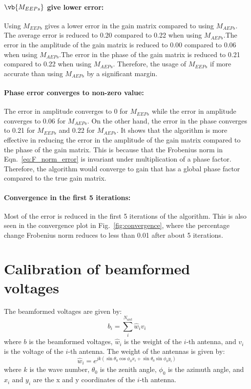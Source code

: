 \documentclass[10pt,a4paper,twocolumn]{paper}
\begin{document}
\paragraph*{$\vb{{M}_{EEPs}}$ give lower error:}Using $M_{EEPs}$ gives a lower error in the gain matrix compared to using $M_{AEPs}$. The average error is reduced to 0.20 compared to 0.22 when using $M_{AEPs}$.The error in the amplitude of the gain matrix is reduced to 0.00 compared to 0.06 when using $M_{AEPs}$.The error in the phase of the gain matrix is reduced to 0.21 compared to 0.22 when using $M_{AEPs}.$
Therefore, the usage of $M_{EEPs}$ if more accurate than using $M_{AEPs}$ by a significant margin.

\paragraph*{Phase error converges to non-zero value:}
The error in amplitude converges to 0 for $M_{EEPs}$ while the error in amplitude converges to 0.06 for $M_{AEPs}$. On the other hand, the error in the phase converges to 0.21 for $M_{EEPs}$ and 0.22 for $M_{AEPs}$.
It shows that the algorithm is more effective in reducing the error in the amplitude of the gain matrix compared to the phase of the gain matrix. This is because that the Frobenius norm in Eqn.~\ref{eq:F_norm_error} is invariant under multiplication of a phase factor. Therefore, the algorithm would converge to gain that has a global phase factor compared to the true gain matrix.

\paragraph*{Convergence in the first 5 iterations:}
Most of the error is reduced in the first 5 iterations of the algorithm. This is also seen in the convergence plot in Fig.~\ref{fig:convergence}, where the percentage change Frobenius norm reduces to less than 0.01 after about 5 iterations.

\section{Calibration of beamformed voltages}
The beamformed voltages are given by:
\begin{equation}
    b_i = \sum_{i}^{N_{ant}} \hat{w}_i v_i
    \label{eq:beamformed_voltages}
\end{equation}
where $b$ is the beamformed voltages, $\hat{w}_i$ is the weight of the $i$-th antenna, and $v_i$ is the voltage of the $i$-th antenna.
The weight of the antennas is given by:
\begin{equation}
    \hat{w}_i = e^{jk(\sin\theta_0 \cos\phi_0 x_i + \sin\theta_0 \sin\phi_0 y_i)}
    \label{eq:weight}
\end{equation}
where $k$ is the wave number, $\theta_0$ is the zenith angle, $\phi_0$ is the azimuth angle, and $x_i$ and $y_i$ are the x and y coordinates of the $i$-th antenna.
\end{document}
